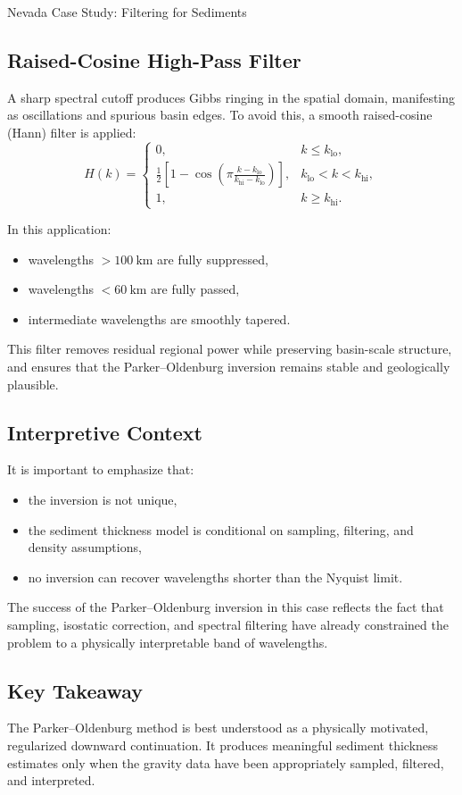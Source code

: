 \begin{activity}{Nevada Case Study: Filtering for Sediments}
\subsection*{Raised-Cosine High-Pass Filter}

A sharp spectral cutoff produces Gibbs ringing in the spatial domain,
manifesting as oscillations and spurious basin edges.
To avoid this, a smooth raised-cosine (Hann) filter is applied:
\begin{equation}
H(k) =
\begin{cases}
0, & k \le k_{\text{lo}}, \\
\frac{1}{2}
\left[
1 - \cos\!\left(
\pi \frac{k - k_{\text{lo}}}{k_{\text{hi}} - k_{\text{lo}}}
\right)
\right],
& k_{\text{lo}} < k < k_{\text{hi}}, \\
1, & k \ge k_{\text{hi}}.
\end{cases}
\end{equation}

In this application:
\begin{itemize}
  \item wavelengths $> 100~\text{km}$ are fully suppressed,
  \item wavelengths $< 60~\text{km}$ are fully passed,
  \item intermediate wavelengths are smoothly tapered.
\end{itemize}

This filter removes residual regional power while preserving basin-scale structure,
and ensures that the Parker--Oldenburg inversion remains stable and geologically
plausible.

\subsection*{Interpretive Context}

It is important to emphasize that:
\begin{itemize}
  \item the inversion is not unique,
  \item the sediment thickness model is conditional on sampling, filtering,
        and density assumptions,
  \item no inversion can recover wavelengths shorter than the Nyquist limit.
\end{itemize}

The success of the Parker--Oldenburg inversion in this case reflects the fact that
sampling, isostatic correction, and spectral filtering have already constrained
the problem to a physically interpretable band of wavelengths.

\subsection*{Key Takeaway}

The Parker--Oldenburg method is best understood as a physically motivated,
regularized downward continuation.
It produces meaningful sediment thickness estimates only when the gravity data
have been appropriately sampled, filtered, and interpreted.

\end{activity}
